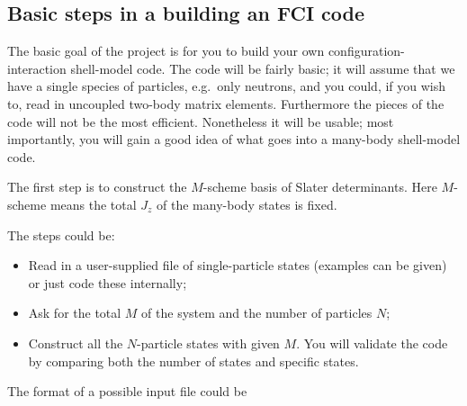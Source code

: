 \documentclass[graybox,sectrefs,envcountresetchap,open=right]{svmonodo}
\begin{document}
\noindent

\subsection{Basic steps in a building an FCI code}

The basic goal of the project is for you to build your own configuration-interaction  shell-model 
code. The code will be fairly basic; it will assume that we have 
a single species of particles, e.g.~only neutrons, 
and you could, if you wish to,  read in uncoupled two-body matrix elements.  Furthermore the pieces of the code will not 
be the most efficient.  Nonetheless it will be usable; most importantly, you will gain a good idea of what goes into a many-body shell-model code.

The first step  is to construct the $M$-scheme basis of Slater determinants.
Here $M$-scheme means the total $J_z$ of the many-body states is fixed.

The steps could be:

\begin{itemize}
\item Read in a user-supplied file of single-particle states (examples can be given) or just code these internally;

\item Ask for the total $M$ of the system and the number of particles $N$;

\item Construct all the $N$-particle states with given $M$.  You will validate the code by  comparing both the number of states and specific states.
\end{itemize}

\noindent
The format of a possible input  file could be
\end{document}
